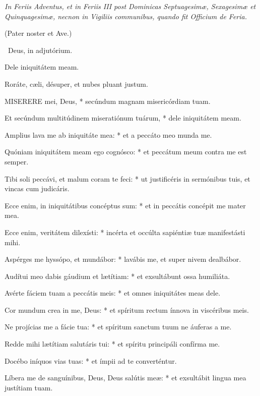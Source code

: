 
\sectionornament


\textit{In Feriis Adventus, et in Feriis III post Dominicas Septuagesimæ, Sexagesimæ et Quinquagesimæ, necnon in Vigiliis communibus, quando fit Officium de Feria.}

(Pater noster et Ave.)

\V\ Deus, in adjutórium.

 Dele iniquitátem meam.

  Roráte, cæli, désuper, et nubes pluant justum.


\lettrine[lines=2]{M}{ISERERE} mei, Deus, * secúndum magnam misericórdiam tuam.

Et secúndum multitúdinem miseratiónum tuárum, * dele iniquitátem meam.

Amplius lava me ab iniquitáte mea: * et a peccáto meo munda me.

Quóniam iniquitátem meam ego cognósco: * et peccátum meum contra me est semper.

Tibi soli peccávi, et malum coram te feci: * ut justificéris in sermónibus tuis, et vincas cum judicáris.

Ecce enim, in iniquitátibus concéptus sum: * et in peccátis concépit me mater mea.

Ecce enim, veritátem dilexísti: * incérta et occúlta sapiéntiæ tuæ manifestásti mihi.

Aspérges me hyssópo, et mundábor: * lavábis me, et super nivem dealbábor.

Audítui meo dabis gáudium et lætítiam: * et exsultábunt ossa humiliáta.

Avérte fáciem tuam a peccátis meis: * et omnes iniquitátes meas dele.

Cor mundum crea in me, Deus: * et spíritum rectum ínnova in viscéribus meis.

Ne projícias me a fácie tua: * et spíritum sanctum tuum ne áuferas a me.

Redde mihi lætítiam salutáris tui: * et spíritu principáli confírma me.

Docébo iníquos vias tuas: * et ímpii ad te converténtur.

Líbera me de sanguínibus, Deus, Deus salútis meæ: * et exsultábit lingua mea justítiam tuam.

